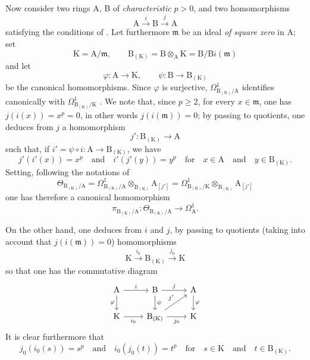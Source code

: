 \begin{env}[22.4.5]
\label{0.22.4.5}
Now consider two rings $\mathrm{A}$, $\mathrm{B}$ of \emph{characteristic} $p>0$, and two homomorphisms
\[
  \mathrm{A}\xrightarrow{i}\mathrm{B}\xrightarrow{j}\mathrm{A}
\]
satisfying the conditions of .
Let furthermore $\mathfrak{m}$ be an ideal \emph{of square zero} in $\mathrm{A}$; set
\[
  \mathrm{K}=\mathrm{A}/\mathfrak{m},\qquad \mathrm{B}_{(\mathrm{K})}=\mathrm{B}\otimes_\mathrm{A}\mathrm{K}=\mathrm{B}/\mathrm{B}i(\mathfrak{m})
\]
and let
\[
  \varphi:\mathrm{A}\to\mathrm{K},\qquad \psi:\mathrm{B}\to\mathrm{B}_{(\mathrm{K})}
\]
be the canonical homomorphisms.
Since $\varphi$ is surjective, $\Omega^1_{\mathrm{B}_{(\mathrm{K})}/\mathrm{A}}$ identifies canonically with $\Omega^1_{\mathrm{B}_{(\mathrm{K})}/\mathrm{K}}$ .
We note that, since $p\geq 2$, for every $x\in\mathfrak{m}$, one has $j(i(x))=x^p=0$, in other words $j(i(\mathfrak{m}))=0$; by passing to quotients, one deduces from $j$ a homomorphism
\[
  j':\mathrm{B}_{(\mathrm{K})}\to\mathrm{A}
\]
such that, if $i'=\psi\circ i:\mathrm{A}\to\mathrm{B}_{(\mathrm{K})}$, we have
\[
  j'(i'(x))=x^p \quad\text{and}\quad i'(j'(y))=y^p
  \quad\text{for}\quad x\in\mathrm{A}\quad\text{and}\quad y\in\mathrm{B}_{(\mathrm{K})}.
\]
Setting, following the notations of 
\[
  \Theta_{\mathrm{B}_{(\mathrm{K})}/\mathrm{A}}=\Omega^1_{\mathrm{B}_{(\mathrm{K})}/\mathrm{A}}\otimes_{\mathrm{B}_{(\mathrm{K})}}\mathrm{A}_{[j']}=\Omega^1_{\mathrm{B}_{(\mathrm{K})}/\mathrm{K}}\otimes_{\mathrm{B}_{(\mathrm{K})}}\mathrm{A}_{[j']}
\]
one has therefore  a canonical homomorphism
\[
\label{0.22.4.5.1}
  \pi_{\mathrm{B}_{(\mathrm{K})}/\mathrm{A}}:\Theta_{\mathrm{B}_{(\mathrm{K})}/\mathrm{A}}\to\Omega^1_\mathrm{A}.
  \tag{22.4.5.1}
\]

On the other hand, one deduces from $i$ and $j$, by passing to quotients (taking into account that $j(i(\mathfrak{m}))=0$) homomorphisms
\[
  \mathrm{K}\xrightarrow{i_0}\mathrm{B}_{(\mathrm{K})}\xrightarrow{j_0}\mathrm{K}
\]
so that one has the commutative diagram
\[
  \begin{tikzcd}
    \mathrm{A} \ar[r,"i"] \ar[d,"\varphi"'] & \mathrm{B} \ar[r,"j"] \ar[d,"\psi"] & \mathrm{A} \ar[d,"\varphi"]\\
    \mathrm{K} \ar[r,"i_0"'] & \mathrm{B}_{(\mathrm{K})} \ar[r,"j_0"'] \ar[ur,"j'"] & \mathrm{K}
  \end{tikzcd}
\]
It is clear furthermore that
\[
  j_0(i_0(s))=s^p \quad\text{and}\quad i_0(j_0(t))=t^p
  \quad\text{for}\quad s\in\mathrm{K}\quad\text{and}\quad t\in\mathrm{B}_{(\mathrm{K})}.
\]


\end{env}
